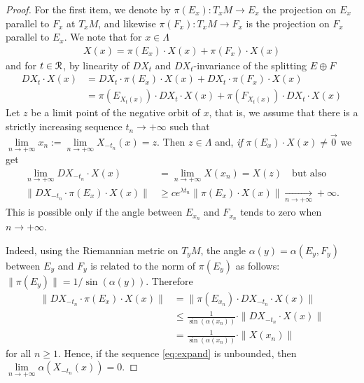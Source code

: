 \documentclass[12pt,reqno]{amsart}
\numberwithin{equation}{section}
\theoremstyle{plain}
\theoremstyle{definition}
\newcommand{\R}{\EuScript{R}}
\begin{document}
\begin{proof} For the first item, we denote by
  $\pi(E_x):T_x M\to E_x$ the projection on $E_x$
  parallel to $F_x$ at $T_x M$, and likewise
  $\pi(F_x):T_x M\to F_x$ is the projection on $F_x$
  parallel to $E_x$. We note that for $x\in\Lambda$
  \begin{align*}
    X(x)=\pi(E_x)\cdot X(x) + \pi(F_x)\cdot X(x)
  \end{align*}
  and for $t\in\R$, by linearity of $DX_t$ and
  $DX_t$-invariance of the splitting $ E\oplus F$
  \begin{align*}
    DX_{t}\cdot X(x)
    &=
    DX_{t}\cdot\pi(E_x)\cdot X(x)
    +
    DX_{t}\cdot\pi(F_x)\cdot X(x)
    \\
    &=
    \pi(E_{X_{t}(x)})\cdot DX_{t} \cdot X(x)
    + \pi(F_{X_{t}(x)}) \cdot DX_{t} \cdot X(x)
  \end{align*}
  Let $z$ be a limit point of the negative orbit of $x$,
  that is, we assume that there is a strictly increasing
  sequence $t_n\to+\infty$ such that
  $\lim\limits_{n\to+\infty}x_{n}:=\lim\limits_{n\to+\infty}X_{-t_n}(x)
  = z$. Then $z\in\Lambda$ and, \emph{if} $\pi(E_x)\cdot
  X(x)\neq\vec0$ we get
  \begin{align}
    \lim\limits_{n\to+\infty} DX_{-t_n}\cdot X(x)
    &=
    \lim\limits_{n\to+\infty} X(x_n) = X(z) \quad\text{but
      also}
    \nonumber
    \\
    \|DX_{-t_n}\cdot\pi(E_x)\cdot X(x)\|
    &\ge
    c e^{\lambda t_n}\|\pi(E_x)\cdot
    X(x)\|\xrightarrow[n\to+\infty]{}+\infty.
    \label{eq:expand}
  \end{align}
  This is possible only if the angle between
  $E_{x_n}$ and $F_{x_n}$ tends to zero when
  $n\to+\infty$.

  Indeed, using the Riemannian metric on $T_y M$, the angle
  $\alpha(y)=\alpha(E_y,F_y)$ between $E_y$ and $F_y$ is
  related to the norm of $\pi(E_y)$ as follows:
  $\|\pi(E_y)\|=1/\sin(\alpha(y))$. Therefore
  \begin{align*}
    \|DX_{-t_n}\cdot\pi(E_x)\cdot X(x)\|
    &=
    \|\pi(E_{x_n})\cdot DX_{-t_n} \cdot X(x) \|
    \\
    &\le
    \frac1{\sin(\alpha(x_n))}
    \cdot
    \|DX_{-t_n} \cdot X(x) \|
    \\
    &=
    \frac1{\sin(\alpha(x_n))}
    \cdot \|X(x_n)\|
  \end{align*}
  for all $n\ge1$. Hence, if the sequence \eqref{eq:expand}
  is unbounded, then
  $\lim\limits_{n\to+\infty} \alpha(X_{-t_n}(x)) = 0$.


\end{proof}
\end{document}
